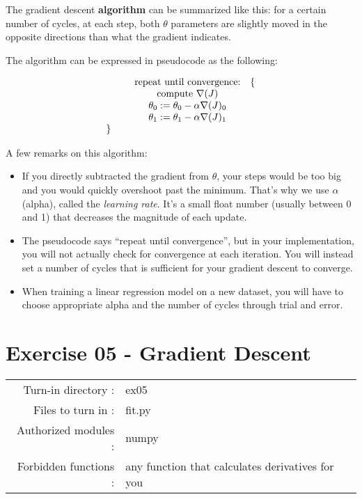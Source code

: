 \documentclass[]{article}
\begin{document}
The gradient descent \textbf{algorithm} can be summarized like this: for
a certain number of cycles, at each step, both \(\theta\) parameters are
slightly moved in the opposite directions than what the gradient
indicates.

The algorithm can be expressed in pseudocode as the following:

\large

\[
\begin{matrix}
&\text{repeat until convergence:} & \{\\
&    \text{compute } \nabla{(J)}  \\
&   \theta_0 := \theta_0 - \alpha \nabla(J)_0  \\ 
&   \theta_1 := \theta_1 - \alpha \nabla(J)_1\\
    \} \hspace{0.5cm} 
\end{matrix}
\] \normalsize

A few remarks on this algorithm:

\begin{itemize}
\item
  If you directly subtracted the gradient from \(\theta\), your steps
  would be too big and you would quickly overshoot past the minimum.
  That's why we use \(\alpha\) (alpha), called the \emph{learning rate}.
  It's a small float number (usually between 0 and 1) that decreases the
  magnitude of each update.
\item
  The pseudocode says ``repeat until convergence'', but in your
  implementation, you will not actually check for convergence at each
  iteration. You will instead set a number of cycles that is sufficient
  for your gradient descent to converge.
\item
  When training a linear regression model on a new dataset, you will
  have to choose appropriate alpha and the number of cycles through
  trial and error.
\end{itemize}

\clearpage

\hypertarget{exercise-05---gradient-descent-1}{%
\section{Exercise 05 - Gradient
Descent}\label{exercise-05---gradient-descent-1}}

\begin{longtable}[]{@{}rl@{}}
\toprule
\endhead
Turn-in directory : & ex05\tabularnewline
Files to turn in : & fit.py\tabularnewline
Authorized modules : & numpy\tabularnewline
Forbidden functions : & any function that calculates derivatives for
you\tabularnewline
\bottomrule
\end{longtable}
\end{document}
